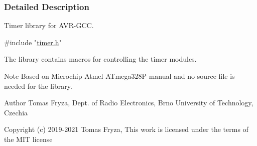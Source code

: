\subsubsection{Detailed Description}
Timer library for A\+V\+R-\/\+G\+CC. 


\begin{DoxyCode}
\textcolor{preprocessor}{#include "\hyperlink{a00006}{timer.h}"} 
\end{DoxyCode}


The library contains macros for controlling the timer modules.

\begin{DoxyNote}{Note}
Based on Microchip Atmel A\+Tmega328P manual and no source file is needed for the library. 
\end{DoxyNote}
\begin{DoxyAuthor}{Author}
Tomas Fryza, Dept. of Radio Electronics, Brno University of Technology, Czechia 
\end{DoxyAuthor}
\begin{DoxyCopyright}{Copyright}
(c) 2019-\/2021 Tomas Fryza, This work is licensed under the terms of the M\+IT license 
\end{DoxyCopyright}
